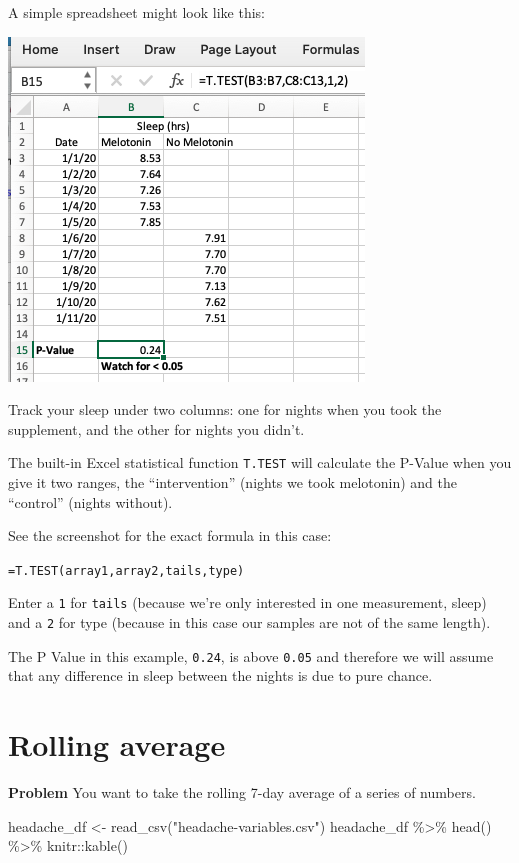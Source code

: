 \documentclass[
]{book}
\newenvironment{Shaded}{\begin{snugshade}}{\end{snugshade}}
\newcommand{\FunctionTok}[1]{\textcolor[rgb]{0.00,0.00,0.00}{#1}}
\newcommand{\NormalTok}[1]{#1}
\newcommand{\OtherTok}[1]{\textcolor[rgb]{0.56,0.35,0.01}{#1}}
\newcommand{\SpecialCharTok}[1]{\textcolor[rgb]{0.00,0.00,0.00}{#1}}
\newcommand{\StringTok}[1]{\textcolor[rgb]{0.31,0.60,0.02}{#1}}
\begin{document}
A simple spreadsheet might look like this:

\includegraphics{image-20200828173214548.png}

Track your sleep under two columns: one for nights when you took the supplement, and the other for nights you didn't.

The built-in Excel statistical function \texttt{T.TEST} will calculate the P-Value when you give it two ranges, the ``intervention'' (nights we took melotonin) and the ``control'' (nights without).

See the screenshot for the exact formula in this case:

\texttt{=T.TEST(array1,array2,tails,type)}

Enter a \texttt{1} for \texttt{tails} (because we're only interested in one measurement, sleep) and a \texttt{2} for type (because in this case our samples are not of the same length).

The P Value in this example, \texttt{0.24}, is above \texttt{0.05} and therefore we will assume that any difference in sleep between the nights is due to pure chance.

\hypertarget{rolling-average}{%
\section{Rolling average}\label{rolling-average}}

\textbf{Problem} You want to take the rolling 7-day average of a series of numbers.

\begin{Shaded}
\begin{Highlighting}[]
\NormalTok{headache\_df }\OtherTok{\textless{}{-}} \FunctionTok{read\_csv}\NormalTok{(}\StringTok{"headache{-}variables.csv"}\NormalTok{)}
\NormalTok{headache\_df }\SpecialCharTok{\%\textgreater{}\%} \FunctionTok{head}\NormalTok{() }\SpecialCharTok{\%\textgreater{}\%}\NormalTok{ knitr}\SpecialCharTok{::}\FunctionTok{kable}\NormalTok{()}
\end{Highlighting}
\end{Shaded}
\end{document}
